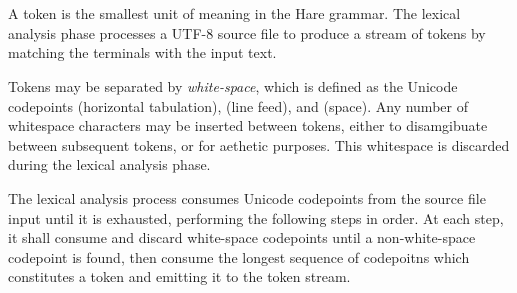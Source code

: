 
\begin{grammar}
\\
	 \\
\end{grammar}

\specsubitem
A token is the smallest unit of meaning in the Hare grammar. The lexical
analysis phase processes a UTF-8 source file to produce a stream of tokens by
matching the terminals with the input text.

\specsubitem
Tokens may be separated by \textit{white-space}, which is defined as the
Unicode codepoints  (horizontal tabulation),  (line
feed), and  (space). Any number of whitespace characters may be
inserted between tokens, either to disamgibuate between subsequent tokens, or
for aethetic purposes. This whitespace is discarded during the lexical analysis
phase.



\specsubitem
The lexical analysis process consumes Unicode codepoints from the source file
input until it is exhausted, performing the following steps in order. At each
step, it shall consume and discard white-space codepoints until a
non-white-space codepoint is found, then consume the longest sequence of
codepoitns which constitutes a token and emitting it to the token stream.
